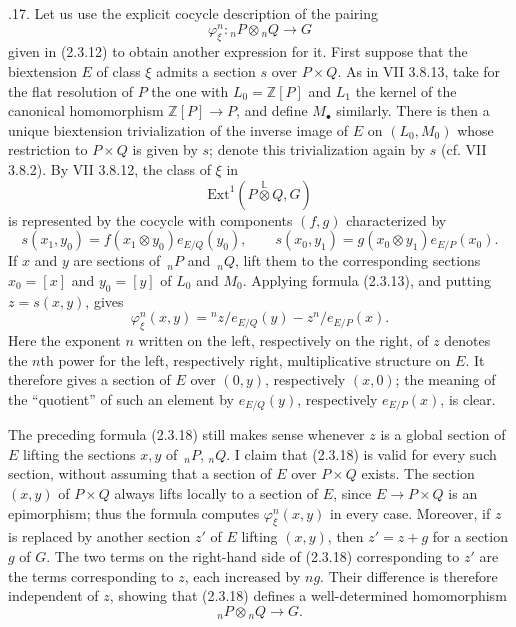 
\medskip
{}.17.  Let us use the explicit cocycle description of the
pairing
\[
 \varphi_\xi^n:{}_nP\otimes{}_nQ\longrightarrow G
\]
given in (2.3.12) to obtain another expression for it.  First suppose
that the biextension $E$ of class $\xi$ admits a section $s$ over
$P\times Q$.  As in VII 3.8.13, take for the flat resolution of $P$
the one with $L_0=\mathbb Z[P]$ and $L_1$ the kernel of the canonical
homomorphism $\mathbb Z[P]\longrightarrow P$, and define
$M_\bullet$ similarly.  There is then a unique biextension
trivialization of the inverse image of $E$ on $(L_0,M_0)$ whose
restriction to $P\times Q$ is given by $s$; denote this trivialization
again by $s$ (cf. VII 3.8.2).  By VII 3.8.12, the class of $\xi$ in
\[
 \mathrm{Ext}^1\!\left(
 P\mathbin{\overset{\mathbb L}{\otimes}}Q,G\right)
\]
is represented by the cocycle with components $(f,g)$ characterized by
\[
 s(x_1,y_0)=f(x_1\otimes y_0)e_{E/Q}(y_0),
 \qquad
 s(x_0,y_1)=g(x_0\otimes y_1)e_{E/P}(x_0).
\]
If $x$ and $y$ are sections of $\,{}_nP$ and $\,{}_nQ$, lift them to
the corresponding sections $x_0=[x]$ and $y_0=[y]$ of $L_0$ and
$M_0$.  Applying formula (2.3.13), and putting $z=s(x,y)$, gives
\begin{equation}\tag{2.3.18}
 \varphi_\xi^n(x,y)
 ={}^n z/e_{E/Q}(y)-z^n/e_{E/P}(x).
\end{equation}
Here the exponent $n$ written on the left, respectively on the right,
of $z$ denotes the $n$th power for the left, respectively right,
multiplicative structure on $E$.  It therefore gives a section of $E$
over $(0,y)$, respectively $(x,0)$; the meaning of the ``quotient'' of
such an element by $e_{E/Q}(y)$, respectively $e_{E/P}(x)$, is clear.

The preceding formula (2.3.18) still makes sense whenever $z$ is a
global section of $E$ lifting the sections $x,y$ of
$\,{}_nP,\,{}_nQ$.  I claim that (2.3.18) is valid for every such
section, without assuming that a section of $E$ over $P\times Q$
exists.  The section $(x,y)$ of $P\times Q$ always lifts locally to a
section of $E$, since $E\longrightarrow P\times Q$ is an epimorphism;
thus the formula computes $\varphi_\xi^n(x,y)$ in every case.
Moreover, if $z$ is replaced by another section $z'$ of $E$ lifting
$(x,y)$, then $z'=z+g$ for a section $g$ of $G$.  The two terms on the
right-hand side of (2.3.18) corresponding to $z'$ are the terms
corresponding to $z$, each increased by $ng$.  Their difference is
therefore independent of $z$, showing that (2.3.18) defines a
well-determined homomorphism
\[
 {}_nP\otimes{}_nQ\longrightarrow G.
\]

